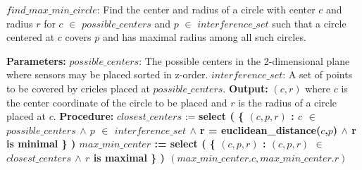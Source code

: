 
\begin{algorithm}[!htb] 
\caption{\textbf{$find\_max\_min\_circle$}: Find the center and radius of a circle with center $c$ and radius $r$ 
for $c$ $\in$ $possible\_centers$  and $p$  $\in$ $interference\_set$ such that 
a circle centered at $c$ covers $p$ and has maximal radius among all such circles.} 
\begin{algorithmic} 
\State \textbf{Parameters:} 
\State \tab  $possible\_centers$: The possible centers in the 2-dimensional plane 
\State \tab  where sensors may be placed sorted in z-order. 
\State \tab $interference\_set$: A set of points to be covered by cricles placed 
\State \tab \tab \tab at $possible\_centers$. 
\State \textbf{Output:} 
\State \tab $(c,r)$ where $c$ is the center coordinate of the circle to be placed and $r$ 
\State \tab is the radius of a circle placed at $c$.
\State \textbf{Procedure:} 
\State
\State $closest\_centers$ := \bf{select} ( \{ $(c,p,r)$ : $c$ $\in$ $possible\_centers$ 
\State \tab \tab \tab                       $\wedge$ $p$  $\in$ $interference\_set$ 
\State \tab \tab \tab                       $\wedge$ r = \bf{euclidean\_distance}($c$,$p$)
\State \tab \tab \tab                       $\wedge$ r is minimal \} )
\State $max\_min\_center$ := \bf{select} ( \{ $(c,p,r)$ :
\State \tab \tab \tab 				      $(c,p,r)$ $\in$ $closest\_centers$ 
\State \tab \tab \tab                     $\wedge$ $r$ is maximal \} )
\State \Return $(max\_min\_center.c,max\_min\_center.r)$ 
\end{algorithmic}
\end{algorithm}

